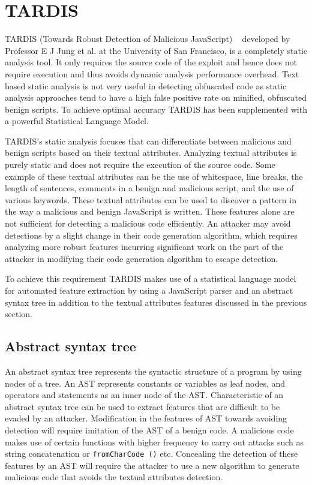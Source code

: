 \newpage

\section{TARDIS} \label{tardis}

TARDIS (Towards Robust Detection of Malicious JavaScript) ~\cite{g1} developed by Professor E J Jung et al. at the University of San Francisco, is a completely static analysis tool. It only requires the source code of the exploit and hence does not require execution and thus avoids dynamic analysis performance overhead. Text based static analysis is not very useful in detecting obfuscated code as static analysis approaches tend to have a high false positive rate on minified, obfuscated benign scripts. To achieve optimal accuracy TARDIS has been supplemented with a powerful Statistical Language Model.

TARDIS's static analysis focuses that can differentiate between malicious and benign scripts based on their textual attributes. Analyzing textual attributes is purely static and does not require the execution of the source code. Some example of these textual attributes can be the use of whitespace, line breaks, the length of sentences, comments in a benign and malicious script, and the use of various keywords. These textual attributes can be used to discover a pattern in the way a malicious and benign JavaScript is written. These features alone are not sufficient for detecting a malicious code efficiently. An attacker may avoid detections by a slight change in their code generation algorithm, which requires analyzing more robust features incurring significant work on the part of the attacker in modifying their code generation algorithm to escape detection.

To achieve this requirement TARDIS makes use of a statistical language model for automated feature extraction by using a JavaScript parser and an abstract syntax tree in addition to the textual attributes features discussed in the previous section.

\subsection{Abstract syntax tree}

An abstract syntax tree represents the syntactic structure of a program by using nodes of a tree. An AST represents constants or variables as leaf nodes, and operators and statements as an inner node of the AST. Characteristic of an abstract syntax tree can be used to extract features that are difficult to be evaded by an attacker. Modification in the features of AST towards avoiding detection will require imitation of the AST of a benign code. A malicious code makes use of certain functions with higher frequency to carry out attacks such as string concatenation or \texttt{fromCharCode ()} etc. Concealing the detection of these features by an AST will require the attacker to use a new algorithm to generate malicious code that avoids the textual attributes detection.

